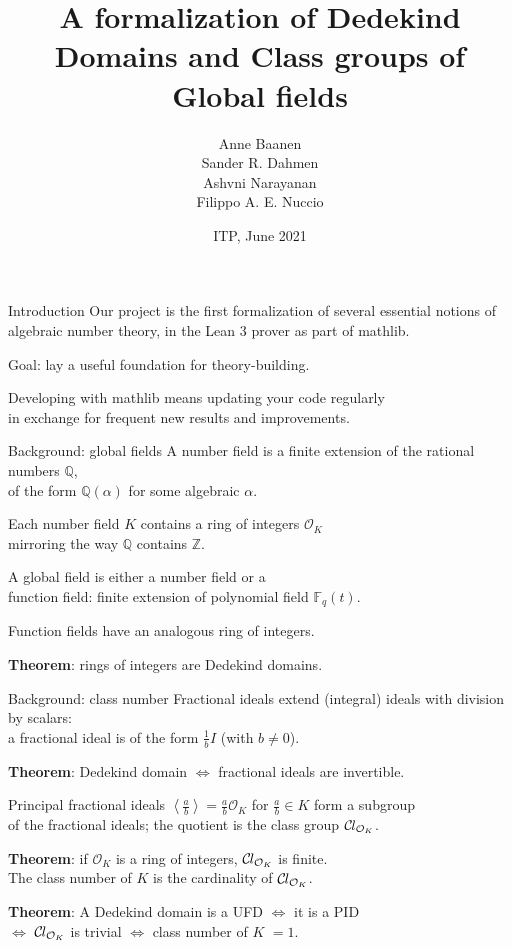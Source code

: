 \documentclass{beamer}
\title{A formalization of Dedekind Domains and Class groups of Global fields}
\author{Anne Baanen \\ Sander R. Dahmen \\ Ashvni Narayanan \\ Filippo A. E. Nuccio}
\date{ITP, June 2021}
\newcommand*{\OK}[1][K]{\mathcal{O}_{#1}}
\newcommand*{\Cl}{\mathcal{C}\kern-.075em l}
\newcommand*{\Fq}[1][q]{\mathbb{F}_{#1}}
\newcommand{\mathlib}{\textsf{mathlib}\xspace}
\newcommand{\Q}{\mathbb{Q}}
\newcommand{\Z}{\mathbb{Z}}
\begin{document}
\begin{frame}
	\maketitle
\end{frame}

\begin{frame}{Introduction}
	Our project is the first formalization of several essential notions of
	\alert{algebraic number theory}, in the Lean 3 prover as part of \mathlib.

	Goal: lay a useful foundation for theory-building.

	Developing with \mathlib means updating your code regularly\\
	in exchange for frequent new results and improvements.
\end{frame}

\begin{frame}{Background: global fields}
	A \alert{number field} is a finite extension of the rational numbers $\Q$,\\
	of the form $\Q(\alpha)$ for some algebraic $\alpha$.

\pause
	Each number field $K$ contains a \alert{ring of integers} $\OK$\\
	mirroring the way $\Q$ contains $\Z$.

\pause
	A \alert{global field} is either a \alert{number field} or a\\
	\alert{function field}: finite extension of polynomial field $\Fq(t)$.

	Function fields have an analogous ring of integers.

\pause
	\textbf{Theorem}: rings of integers are \alert{Dedekind domains}.
\end{frame}

\begin{frame}{Background: class number}
	\alert{Fractional ideals} extend (integral) ideals with division by scalars:\\
	a fractional ideal is of the form $\frac{1}{b} I$ (with $b \ne 0$).

	\textbf{Theorem}: Dedekind domain $\iff$ fractional ideals are invertible.

\pause
	Principal fractional ideals $\left\langle \frac{a}{b} \right\rangle = \frac{a}{b} \OK$ for $\frac{a}{b} \in K$ form a subgroup\\
	of the fractional ideals; the quotient is the \alert{class group} $\Cl_{\OK}$.

	\textbf{Theorem}: if $\OK$ is a ring of integers, $\Cl_{\OK}$ is finite.\\
	The \alert{class number} of $K$ is the cardinality of $\Cl_{\OK}$.

\pause
	\textbf{Theorem}: A Dedekind domain is a UFD $\iff$ it is a PID\\
	$\iff$ $\Cl_{\OK}$ is trivial $\iff$ class number of $K$ $= 1$.
\end{frame}
\end{document}
